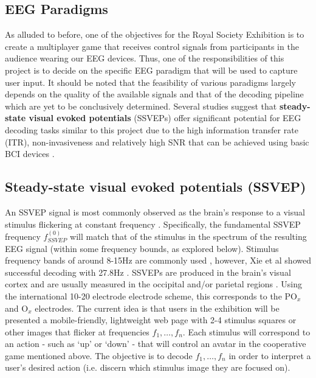 \subsection{EEG Paradigms}
As alluded to before, one of the objectives for the Royal Society Exhibition is to create a multiplayer game that receives control signals from participants in the audience wearing our EEG devices. Thus, one of the responsibilities of this project is to decide on the specific EEG paradigm that will be used to capture user input. It should be noted that the feasibility of various paradigms largely depends on the quality of the available signals and that of the decoding pipeline which are yet to be conclusively determined. Several studies suggest that \textbf{steady-state visual evoked potentials} \cite{Fernandez-Fraga2016}\cite{Kanoga2020}\cite{Acampora2021} (SSVEPs) offer significant potential for EEG decoding tasks similar to this project due to the high information transfer rate (ITR), non-invasiveness and relatively high SNR that can be achieved using basic BCI devices \cite{Zhu2021}. 

\subsection{Steady-state visual evoked potentials (SSVEP)}
An SSVEP signal is most commonly observed as the brain's response to a visual stimulus flickering at constant frequency \cite{Xie2016}. Specifically, the fundamental SSVEP frequency $f_{SSVEP}^{(0)}$ will match that of the stimulus in the spectrum of the resulting EEG signal (within some frequency bounds, as explored below). Stimulus frequency bands of around 8-15Hz are commonly used \cite{Acampora2021}\cite{Chen2017}, however, Xie et al showed successful decoding with 27.8Hz \cite{Xie2016}. SSVEPs are produced in the brain's visual cortex and are usually measured in the occipital and/or parietal regions \cite{Fernandez-Fraga2016}. Using the international 10-20 electrode electrode scheme, this corresponds to the $\text{PO}_x$ and $\text{O}_x$  electrodes. The current idea is that users in the exhibition will be presented a mobile-friendly, lightweight web page with 2-4 stimulus squares or other images that flicker at frequencies $f_1, \dots, f_n$. Each stimulus will correspond to an action - such as `up' or `down' - that will control an avatar in the cooperative game mentioned above. The objective is to decode $f_1, \dots, f_n$ in order to interpret a user's desired action (i.e. discern which stimulus image they are focused on).

